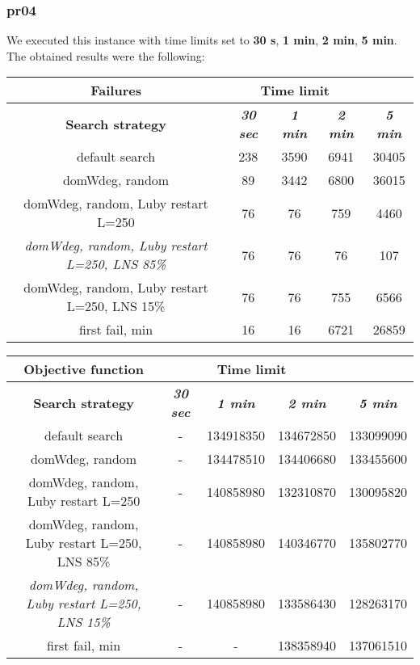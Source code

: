 \subsubsection{pr04}
We executed this instance with time limits set to \textbf{30 s}, \textbf{1 min}, \textbf{2 min}, \textbf{5 min}.\\
The obtained results were the following:
{
\renewcommand{\arraystretch}{2}
\begin{longtable}[h]{| c | c | c | c | c |}
    \hline
    \textbf{Failures} & \multicolumn{3}{c}{Time limit} & \\
    \hline
    \textbf{Search strategy} & \textbf{\textit{30 sec}} & \textbf{\textit{1 min}} & \textbf{\textit{2 min}} & \textbf{\textit{5 min}} \\
    \hline
    \endhead
    default search                                         & 238 &  3590 &  6941 &  30405 \\
    \hline
    domWdeg, random                                        &  89 &  3442 &  6800 &  36015 \\
    \hline
    domWdeg, random, Luby restart L=250                    &  76 &    76 &   759 &   4460 \\
    \hline
    \textit{domWdeg, random, Luby restart L=250, LNS 85\%} &  76 &    76 &    76 &    107 \\
    \hline
    domWdeg, random, Luby restart L=250, LNS 15\%          &  76 &    76 &   755 &   6566 \\
    \hline
    first fail, min                                        &  16 &    16 &  6721 &  26859 \\
    \hline
\end{longtable}
}

{
\renewcommand{\arraystretch}{2}
\begin{longtable}[h]{| c | c | c | c | c |}
    \hline
    \textbf{Objective function} & \multicolumn{3}{c}{Time limit} & \\
    \hline
    \textbf{Search strategy} & \textbf{\textit{30 sec}} & \textbf{\textit{1 min}} & \textbf{\textit{2 min}} & \textbf{\textit{5 min}} \\
    \hline
    \endhead
    default search                                         &         - & 134918350 & 134672850 & 133099090 \\
    \hline
    domWdeg, random                                        &         - & 134478510 & 134406680 & 133455600 \\
    \hline
    domWdeg, random, Luby restart L=250                    &         - & 140858980 & 132310870 & 130095820 \\
    \hline
    domWdeg, random, Luby restart L=250, LNS 85\%          &         - & 140858980 & 140346770 & 135802770 \\
    \hline
    \textit{domWdeg, random, Luby restart L=250, LNS 15\%} &         - & 140858980 & 133586430 & 128263170 \\
    \hline
    first fail, min                                        &        - &         - & 138358940 & 137061510 \\
    \hline
\end{longtable}
}
